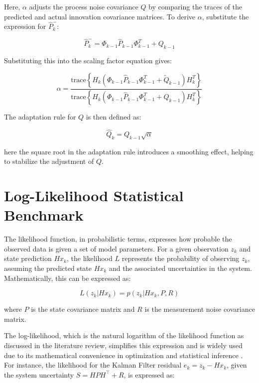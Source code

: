 Here, \( \alpha \) adjusts the process noise covariance \( Q \) by comparing the traces of the predicted and actual innovation covariance matrices. To derive \( \alpha \), substitute the expression for \( \hat{P}^-_k \):

\begin{equation}
    \hat{P}^-_k = \Phi_{k-1} \hat{P}_{k-1} \Phi_{k-1}^T + Q_{k-1}
\end{equation}

Substituting this into the scaling factor equation gives:

\begin{equation}
    \alpha = \frac{\text{trace}\left\{H_k \left(\Phi_{k-1} \hat{P}_{k-1} \Phi_{k-1}^T + \tilde{Q}_{k-1}\right) H_k^T\right\}}{\text{trace}\left\{H_k \left(\Phi_{k-1} \hat{P}_{k-1} \Phi_{k-1}^T + Q_{k-1}\right) H_k^T\right\}}
\end{equation}

The adaptation rule for \( Q \) is then defined as:

\begin{equation}
    \hat{Q}_k = Q_{k-1} \sqrt{\alpha}
\end{equation}

here the square root in the adaptation rule introduces a smoothing effect, helping to stabilize the adjustment of \( Q \).


\section{Log-Likelihood Statistical Benchmark}

The likelihood function, in probabilistic terms, expresses how probable the observed data is given a set of model parameters. For a given observation \( z_k \) and state prediction \( Hx_k \), the likelihood \( L \) represents the probability of observing \( z_k \), assuming the predicted state \( Hx_k \) and the associated uncertainties in the system. Mathematically, this can be expressed as:

\begin{equation}
    L(z_k | Hx_k) = p(z_k | Hx_k, P, R)
\end{equation}

where \( P \) is the state covariance matrix and \( R \) is the measurement noise covariance matrix. 

The log-likelihood, which is the natural logarithm of the likelihood function as discussed in the literature review, simplifies this expression and is widely used due to its mathematical convenience in optimization and statistical inference \cite{Grewal2006}. For instance, the likelihood for the Kalman Filter residual \( e_k = z_k - Hx_k \), given the system uncertainty \( S = HPH^\top + R \), is expressed as:

